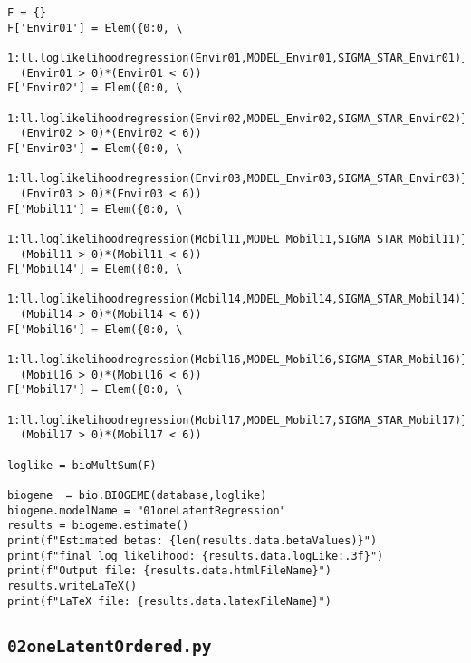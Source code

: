 \documentclass[12pt,a4paper]{article}
\begin{document}
\begin{lstlisting}[style=numbers]
F = {}
F['Envir01'] = Elem({0:0, \
 1:ll.loglikelihoodregression(Envir01,MODEL_Envir01,SIGMA_STAR_Envir01)},\
  (Envir01 > 0)*(Envir01 < 6))
F['Envir02'] = Elem({0:0, \
 1:ll.loglikelihoodregression(Envir02,MODEL_Envir02,SIGMA_STAR_Envir02)},\
  (Envir02 > 0)*(Envir02 < 6))
F['Envir03'] = Elem({0:0, \
 1:ll.loglikelihoodregression(Envir03,MODEL_Envir03,SIGMA_STAR_Envir03)},\
  (Envir03 > 0)*(Envir03 < 6))
F['Mobil11'] = Elem({0:0, \
 1:ll.loglikelihoodregression(Mobil11,MODEL_Mobil11,SIGMA_STAR_Mobil11)},\
  (Mobil11 > 0)*(Mobil11 < 6))
F['Mobil14'] = Elem({0:0, \
 1:ll.loglikelihoodregression(Mobil14,MODEL_Mobil14,SIGMA_STAR_Mobil14)},\
  (Mobil14 > 0)*(Mobil14 < 6))
F['Mobil16'] = Elem({0:0, \
 1:ll.loglikelihoodregression(Mobil16,MODEL_Mobil16,SIGMA_STAR_Mobil16)},\
  (Mobil16 > 0)*(Mobil16 < 6))
F['Mobil17'] = Elem({0:0, \
 1:ll.loglikelihoodregression(Mobil17,MODEL_Mobil17,SIGMA_STAR_Mobil17)},\
  (Mobil17 > 0)*(Mobil17 < 6))

loglike = bioMultSum(F)

biogeme  = bio.BIOGEME(database,loglike)
biogeme.modelName = "01oneLatentRegression"
results = biogeme.estimate()
print(f"Estimated betas: {len(results.data.betaValues)}")
print(f"final log likelihood: {results.data.logLike:.3f}")
print(f"Output file: {results.data.htmlFileName}")
results.writeLaTeX()
print(f"LaTeX file: {results.data.latexFileName}")
\end{lstlisting}


\subsection{\lstinline$02oneLatentOrdered.py$}
\label{sec:02oneLatentOrdered}
\end{document}
